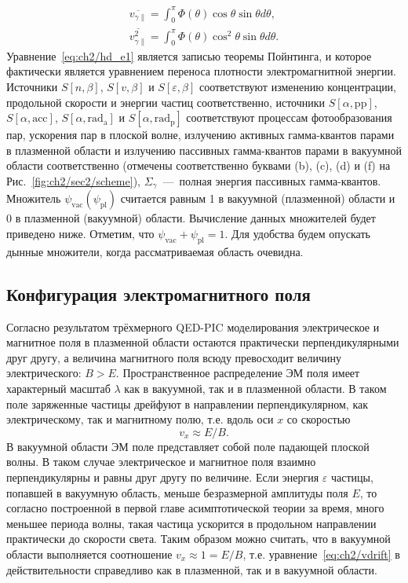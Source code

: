 \begin{align}
    \overline{v_{\gamma\parallel}} = \int_0^\pi \Phi(\theta)\cos\theta\sin\theta d\theta, \\
    \overline{v_{\gamma\parallel}^2} = \int_0^\pi \Phi(\theta)\cos^2\theta\sin\theta d\theta.
\end{align}
Уравнение~\eqref{eq:ch2/hd_e1} является записью теоремы Пойнтинга, и которое фактически является уравнением переноса плотности электромагнитной энергии.
Источники $S[n,\beta]$, $S[v,\beta]$ и $S[\varepsilon,\beta]$ соответствуют изменению концентрации, продольной скорости и энергии частиц соответственно, источники $S[\alpha, \mathrm{pp}]$, $S[\alpha, \mathrm{acc}]$, $S[\alpha, \mathrm{rad_a}]$ и $S[\alpha, \mathrm{rad_p}]$ соответствуют процессам фотообразования пар, ускорения пар в плоской волне, излучению активных гамма-квантов парами в плазменной области и излучению пассивных гамма-квантов парами в вакуумной области соответственно (отмечены соответственно буквами (b), (c), (d) и (f) на Рис.~\ref{fig:ch2/sec2/scheme}), $\Sigma_\gamma$~---~полная энергия пассивных гамма-квантов.
Множитель $\psi_\mathrm{vac}(\psi_\mathrm{pl})$ считается равным 1 в вакуумной (плазменной) области и 0 в плазменной (вакуумной) области.
Вычисление данных множителей будет приведено ниже.
Отметим, что $\psi_\mathrm{vac}+\psi_\mathrm{pl}=1$.
Для удобства будем опускать дынные множители, когда рассматриваемая область очевидна.

\subsection{Конфигурация электромагнитного поля}
\label{sub:ch2/sec3/fields}

Согласно результатом трёхмерного QED-PIC моделирования электрическое и магнитное поля в плазменной области остаются практически перпендикулярными друг другу, а величина магнитного поля всюду превосходит величину электрического: $B > E$.
Пространственное распределение ЭМ поля имеет характерный масштаб $\lambda$ как в вакуумной, так и в плазменной области.
В таком поле заряженные частицы дрейфуют в направлении перпендикулярном, как электрическому, так и магнитному полю, т.е. вдоль оси $x$ со скоростью
\begin{equation}
    \label{eq:ch2/vdrift}
    v_x\approx E/B.
\end{equation}
В вакуумной области ЭМ поле представляет собой поле падающей плоской волны.
В таком случае электрическое и магнитное поля взаимно перпендикулярны и равны друг другу по величине.
Если энергия $\varepsilon$ частицы, попавшей в вакуумную область, меньше безразмерной амплитуды поля $E$, то согласно построенной в первой главе асимптотической теории за время, много меньшее периода волны, такая частица ускорится в продольном направлении практически до скорости света.
Таким образом можно считать, что в вакуумной области выполняется соотношение $v_x\approx 1=E/B$, т.е. уравнение~\eqref{eq:ch2/vdrift} в действительности справедливо как в плазменной, так и в вакуумной области.

